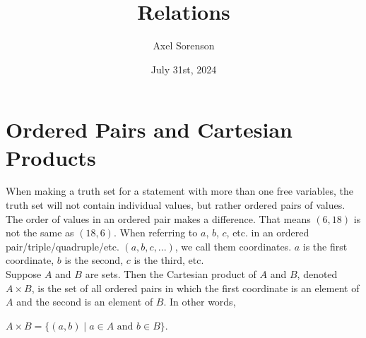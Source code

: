 \documentclass{article}
\title{Relations}
\author{Axel Sorenson}
\date{July 31st, 2024}
\begin{document}
\maketitle

\section{Ordered Pairs and Cartesian Products}
When making a truth set for a statement with more than one free variables, the truth set will not contain individual values, but rather ordered pairs of values. The order of values in an ordered pair makes a difference. That means $(6, 18)$ is not the same as $(18, 6)$. When referring to $a$, $b$, $c$, etc. in an ordered pair/triple/quadruple/etc. $(a, b, c, ...)$, we call them \glspl{coordinate}. $a$ is the first coordinate, $b$ is the second, $c$ is the third, etc.\\

\noindent Suppose $A$ and $B$ are sets. Then the Cartesian product of $A$ and $B$, denoted $A \times B$, is the set of all ordered pairs in which the first coordinate is an element of $A$ and the second is an element of $B$. In other words,
\begin{center}
$A \times B = \{(a,b) \mid a \in A \text{ and } b \in B\}$.
\end{center}
\end{document}
